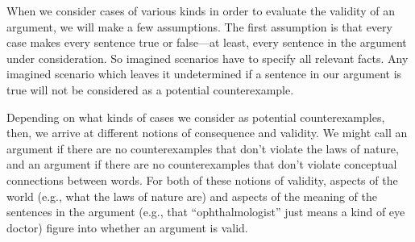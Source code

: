 When we consider cases of various kinds in order to evaluate the validity of an argument, we will make a few assumptions. The first assumption is that every case makes every sentence true or false---at least, every sentence in the argument under consideration.
So imagined scenarios have to specify all relevant facts.
Any imagined scenario which leaves it undetermined if a sentence in our argument is true will not be considered as a potential counterexample.

Depending on what kinds of cases we consider as potential counterexamples, then, we arrive at different notions of consequence and validity. We might call an argument  if there are no counterexamples that don't violate the laws of nature, and an argument  if there are no counterexamples that don't violate conceptual connections between words.
For both of these notions of validity, aspects of the world (e.g., what the laws of nature are) and aspects of the meaning of the sentences in the argument (e.g., that ``ophthalmologist'' just means a kind of eye doctor) figure into whether an argument is valid.


